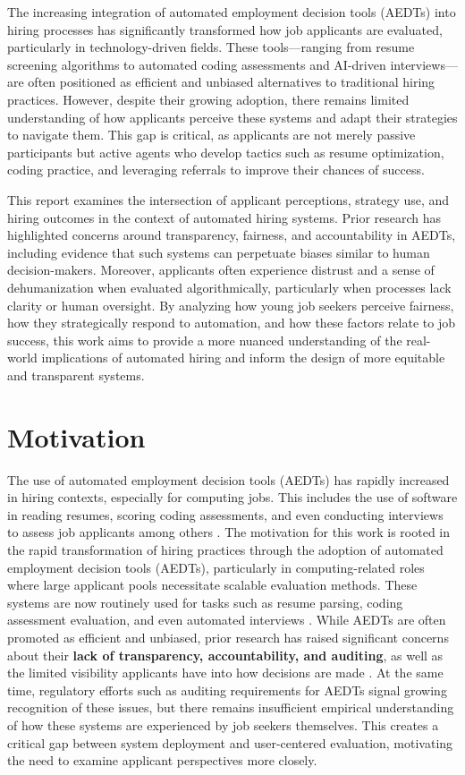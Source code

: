 The increasing integration of automated employment decision tools (AEDTs) into hiring processes has significantly transformed how job applicants are evaluated, particularly in technology-driven fields. These tools—ranging from resume screening algorithms to automated coding assessments and AI-driven interviews—are often positioned as efficient and unbiased alternatives to traditional hiring practices. However, despite their growing adoption, there remains limited understanding of how applicants perceive these systems and adapt their strategies to navigate them. This gap is critical, as applicants are not merely passive participants but active agents who develop tactics such as resume optimization, coding practice, and leveraging referrals to improve their chances of success.

This report examines the intersection of applicant perceptions, strategy use, and hiring outcomes in the context of automated hiring systems. Prior research has highlighted concerns around transparency, fairness, and accountability in AEDTs, including evidence that such systems can perpetuate biases similar to human decision-makers. Moreover, applicants often experience distrust and a sense of dehumanization when evaluated algorithmically, particularly when processes lack clarity or human oversight. By analyzing how young job seekers perceive fairness, how they strategically respond to automation, and how these factors relate to job success, this work aims to provide a more nuanced understanding of the real-world implications of automated hiring and inform the design of more equitable and transparent systems.

\section{Motivation}
The use of automated employment decision tools (AEDTs) has rapidly increased in hiring contexts, especially for computing jobs. This includes the use of software in reading resumes, scoring coding assessments, and even conducting interviews to assess job applicants among others \cite{Bogen2018HelpWA,sanchez2020mean}. The motivation for this work is rooted in the rapid transformation of hiring practices through the adoption of automated employment decision tools (AEDTs), particularly in computing-related roles where large applicant pools necessitate scalable evaluation methods. These systems are now routinely used for tasks such as resume parsing, coding assessment evaluation, and even automated interviews \cite{sanchez2020mean}. While AEDTs are often promoted as efficient and unbiased, prior research has raised significant concerns about their \textbf{lack of transparency, accountability, and auditing}, as well as the limited visibility applicants have into how decisions are made \cite{3_ajunwa2024auditing,62_sloane2022silicon}. At the same time, regulatory efforts such as auditing requirements for AEDTs signal growing recognition of these issues, but there remains insufficient empirical understanding of how these systems are experienced by job seekers themselves. This creates a critical gap between system deployment and user-centered evaluation, motivating the need to examine applicant perspectives more closely.

